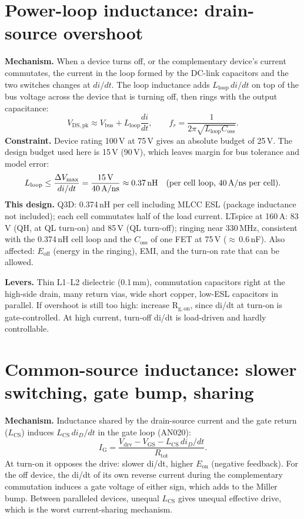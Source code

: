 ﻿\documentclass[10pt,a4paper]{article}
\begin{document}
\section{Power-loop inductance: drain-source overshoot}
\textbf{Mechanism.} When a device turns off, or the complementary device's current commutates, the current in the loop formed by the DC-link capacitors and the two switches changes at $di/dt$. The loop inductance adds $L_\mathrm{loop}\,di/dt$ on top of the bus voltage across the device that is turning off, then rings with the output capacitance:
\begin{equation}
V_\mathrm{DS,pk}\approx V_\mathrm{bus}+L_\mathrm{loop}\frac{di}{dt},\qquad f_r=\frac{1}{2\pi\sqrt{L_\mathrm{loop}C_\mathrm{oss}}}.
\end{equation}
\textbf{Constraint.} Device rating 100\,V at 75\,V gives an absolute budget of 25\,V. The design budget used here is 15\,V (90\,V), which leaves margin for bus tolerance and model error:
\begin{equation}
L_\mathrm{loop}\leq\frac{\Delta V_\mathrm{max}}{di/dt}=\frac{15\,\mathrm{V}}{40\,\mathrm{A/ns}}\approx0.37\,\mathrm{nH}\quad\text{(per cell loop, 40\,A/ns per cell)}.
\end{equation}
\textbf{This design.} Q3D: 0.374\,nH per cell including MLCC ESL (package inductance not included); each cell commutates half of the load current. LTspice at 160\,A: 83\,V (QH, at QL turn-on) and 85\,V (QL turn-off); ringing near 330\,MHz, consistent with the 0.374\,nH cell loop and the $C_\mathrm{oss}$ of one FET at 75\,V ($\approx$\,0.6\,nF). Also affected: $E_\mathrm{off}$ (energy in the ringing), EMI, and the turn-on rate that can be allowed.

\textbf{Levers.} Thin L1--L2 dielectric (0.1\,mm), commutation capacitors right at the high-side drain, many return vias, wide short copper, low-ESL capacitors in parallel. If overshoot is still too high: increase R$_\mathrm{g,on}$, since di/dt at turn-on is gate-controlled. At high current, turn-off di/dt is load-driven and hardly controllable.

\section{Common-source inductance: slower switching, gate bump, sharing}
\textbf{Mechanism.} Inductance shared by the drain-source current and the gate return ($L_\mathrm{CS}$) induces $L_\mathrm{CS}\,di_D/dt$ in the gate loop (AN020):
\begin{equation}
I_\mathrm{G}=\frac{V_\mathrm{drv}-V_\mathrm{GS}-L_\mathrm{CS}\,di_D/dt}{R_\mathrm{tot}}.
\end{equation}
At turn-on it opposes the drive: slower di/dt, higher $E_\mathrm{on}$ (negative feedback). For the off device, the di/dt of its own reverse current during the complementary commutation induces a gate voltage of either sign, which adds to the Miller bump. Between paralleled devices, unequal $L_\mathrm{CS}$ gives unequal effective drive, which is the worst current-sharing mechanism.
\end{document}
